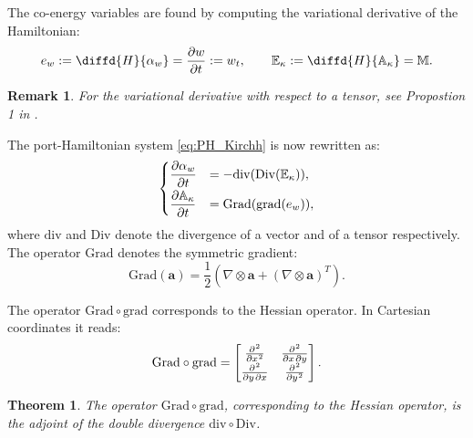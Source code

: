 \documentclass[preprint,12pt]{elsarticle}
\newtheorem{theorem}{Theorem}
\newtheorem{remark}{Remark}
\newcommand{\secondReviewer}[1]{\textcolor{blue!80!black}{#1}}
\begin{document}
The co-energy variables are found by computing the variational derivative of the Hamiltonian:
\begin{equation}
e_w := \diffd{H}{\alpha_w} = \diffp{w}{t} := w_t,  \qquad  \mathbb{E}_{\kappa} := \diffd{H}{\mathbb{A}_{\kappa}} = \mathbb{M}.
\end{equation}
\begin{remark}
For the variational derivative with respect to a tensor, see Propostion 1 in \cite{BrugnoliMin}.
\end{remark}
The port-Hamiltonian system \secondReviewer{\eqref{eq:PH_Kirchh} is now rewritten as:}
\begin{equation}
\label{eq:PH_sys_Kir_Ten_pr}
\begin{cases}
\displaystyle\diffp{\alpha_w}{t} &= - \mathrm{div}(\mathrm{Div}(\mathbb{E}_{\kappa})), \vspace{1mm} \\
\displaystyle\diffp{\mathbb{A}_{\kappa}}{t} &= \mathrm{Grad}(\mathrm{grad}(e_w)),
\end{cases}
\end{equation}
where $\mathrm{div}$ and $\mathrm{Div}$ denote the divergence of a vector and of a tensor respectively. The operator $\mathrm{Grad}$ denotes the symmetric gradient:
\begin{equation}
\mathrm{Grad}(\bm{a}) =  \frac{1}{2} \left(\nabla \otimes \bm{a} + \left(\nabla \otimes \bm{a}\right)^T \right).
\end{equation}

The operator $\mathrm{Grad} \circ \mathrm{grad}$ corresponds to the Hessian operator. In Cartesian coordinates it reads:
\begin{equation}
\mathrm{Grad} \circ \mathrm{grad} = 
\begin{bmatrix}
\diffp[2]{}{x}  &  \diffp{}{x,y} \\
\diffp{}{y,x}   &  \diffp[2]{}{y} \\
\end{bmatrix}.
\end{equation}

\begin{theorem}
The operator $\mathrm{Grad} \circ \mathrm{grad}$, corresponding to the Hessian operator, is the adjoint of the double divergence $\mathrm{div} \circ \mathrm{Div}$.
\end{theorem}
\end{document}
